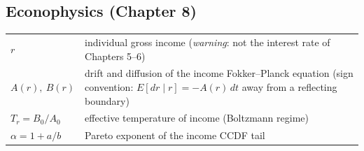 \subsection*{Econophysics (Chapter 8)}

\begin{center}
\begin{tabular}{l p{10.2cm}}
\hline
$r$ & individual gross income (\emph{warning}: not the interest rate of Chapters 5--6) \\
$A(r),\ B(r)$ & drift and diffusion of the income Fokker--Planck equation
  (sign convention: $E[dr\mid r]=-A(r)\,dt$ away from a reflecting boundary) \\
$T_r = B_0/A_0$ & effective temperature of income (Boltzmann regime) \\
$\alpha = 1 + a/b$ & Pareto exponent of the income CCDF tail \\
\hline
\end{tabular}
\end{center}
